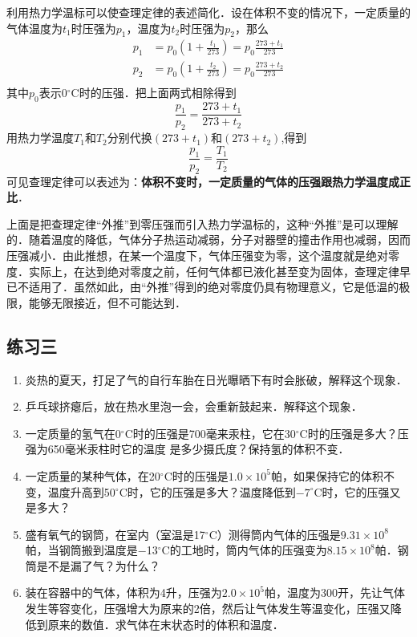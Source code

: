 利用热力学温标可以使查理定律的表述简化．设在体积不变的情况下，一定质量的气体温度为$t_1$时压强为$p_1$，温度为$t_2$时压强为$p_2$，那么
\[\begin{split}
p_1&=p_0\left(1+\frac{t_1}{273}\right)=p_0\frac{273+t_1}{273}\\
p_2&=p_0\left(1+\frac{t_2}{273}\right)=p_0\frac{273+t_2}{273}\\
\end{split} \]
其中$p_0$表示0$^\circ$C时的压强．把上面两式相除得到
\[\frac{p_1}{p_2}=\frac{273+t_1}{273+t_2} \]
用热力学温度$T_1$和$T_2$分别代换$(273+t_1)$和$(273+t_2)$,得到
\[\frac{p_1}{p_2}=\frac{T_1}{T_2} \]
可见查理定律可以表述为：\textbf{体积不变时，一定质量的气体的压强跟热力学温度成正比}．

上面是把查理定律“外推”到零压强而引入热力学温标的，这种“外推”是可以理解的．随着温度的降低，气体分子热运动减弱，分子对器壁的撞击作用也减弱，因而压强减小．由此推想，在某一个温度下，气体压强变为零，这个温度就是绝对零度．实际上，在达到绝对零度之前，任何气体都已液化甚至变为固体，查理定律早已不适用了．虽然如此，由“外推”得到的绝对零度仍具有物理意义，它是低温的极限，能够无限接近，但不可能达到．

\subsection*{练习三}

\begin{enumerate}
	\item 炎热的夏天，打足了气的自行车胎在日光曝晒下有时会胀破，解释这个现象．
\item 乒乓球挤瘪后，放在热水里泡一会，会重新鼓起来．解释这个现象．
\item 一定质量的氢气在0$^\circ$C时的压强是700毫来汞柱，它在30$^\circ$C时的压强是多大？压强为650毫米汞柱时它的温度
是多少摄氏度？保持氢的体积不变．
\item 一定质量的某种气体，在20$^\circ$C时的压强是$1.0\times 10^5$帕，如果保持它的体积不变，温度升高到50$^\circ$C时，它的压强是多大？温度降低到$-7^\circ$C时，它的压强又是多大？
\item 盛有氧气的钢筒，在室内（室温是17$^\circ$C）测得筒内气体的压强是$9.31\times 10^8$帕，当钢筒搬到温度是$-$13$^\circ$C的工地时，筒内气体的压强变为$8.15\times 10^8$帕．钢筒是不是漏了气？为什么？
\item 装在容器中的气体，体积为4升，压强为$2.0\times 10^5$帕，温度为300开，先让气体发生等容变化，压强增大为原来的2倍，然后让气体发生等温变化，压强又降低到原来的数值．求气体在末状态时的体积和温度．

\end{enumerate}

